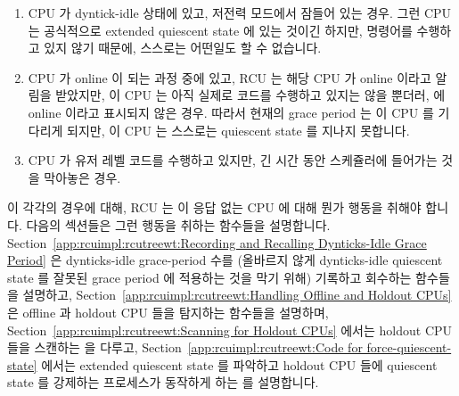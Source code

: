 \begin{enumerate}
\item	CPU 가 dyntick-idle 상태에 있고, 저전력 모드에서 잠들어 있는 경우.
	그런 CPU 는 공식적으로 extended quiescent state 에 있는 것이긴 하지만,
	명령어를 수행하고 있지 않기 때문에, 스스로는 어떤일도 할 수 없습니다.
\item	CPU 가 online 이 되는 과정 중에 있고, RCU 는 해당 CPU 가 online 이라고
	알림을 받았지만, 이 CPU 는 아직 실제로 코드를 수행하고 있지는 않을
	뿐더러,  에 online 이라고 표시되지 않은 경우.
	따라서 현재의 grace period 는 이 CPU 를 기다리게 되지만, 이 CPU 는
	스스로는 quiescent state 를 지나지 못합니다.
\item	CPU 가 유저 레벨 코드를 수행하고 있지만, 긴 시간 동안 스케쥴러에
	들어가는 것을 막아놓은 경우.
\iffalse

\item	The CPU is in dyntick-idle state, and is sleeping in a low-power
	mode.
	Although such a CPU is officially in an extended quiescent state,
	because it is not executing instructions, it cannot do anything
	on its own.
\item	The CPU is in the process of coming online, and RCU has been
	informed that it is online, but this CPU is not yet actually
	executing code, nor is it marked as online in \co{cpu_online_map}.
	The current grace period will therefore wait on it, but it cannot
	yet pass through quiescent states on its own.
\item	The CPU is running user-level code, but has avoided
	entering the scheduler for an extended time period.
\fi
\end{enumerate}

이 각각의 경우에 대해, RCU 는 이 응답 없는 CPU 에 대해 뭔가 행동을 취해야
합니다.
다음의 섹션들은 그런 행동을 취하는 함수들을 설명합니다.
Section~\ref{app:rcuimpl:rcutreewt:Recording and Recalling Dynticks-Idle Grace Period}
은 dynticks-idle grace-period 수를 (올바르지 않게 dynticks-idle quiescent state
를 잘못된 grace period 에 적용하는 것을 막기 위해) 기록하고 회수하는 함수들을
설명하고,
Section~\ref{app:rcuimpl:rcutreewt:Handling Offline and Holdout CPUs}
은 offline 과 holdout CPU 들을 탐지하는 함수들을 설명하며,
Section~\ref{app:rcuimpl:rcutreewt:Scanning for Holdout CPUs}
에서는 holdout CPU 들을 스캔하는  을 다루고,
Section~\ref{app:rcuimpl:rcutreewt:Code for force-quiescent-state}
에서는 extended quiescent state 를 파악하고 holdout CPU 들에 quiescent state 를
강제하는 프로세스가 동작하게 하는  를 설명합니다.
\iffalse

